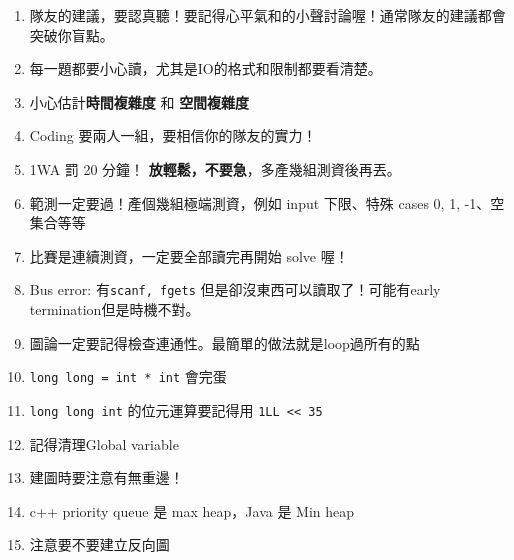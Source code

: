 \documentclass[10pt,oneside]{article}
\begin{document}
\begin{landscape}
\begin{multicols}{2}
{\large
\begin{enumerate}
\item 隊友的建議，要認真聽！要記得心平氣和的小聲討論喔！通常隊友的建議都會突破你盲點。
\item 每一題都要小心讀，尤其是IO的格式和限制都要看清楚。%
\item 小心估計\textbf{時間複雜度} 和 \textbf{空間複雜度}%
\item Coding 要兩人一組，要相信你的隊友的實力！
\item 1WA 罰 20 分鐘！ \textbf{放輕鬆，不要急}，多產幾組測資後再丟。%
\item 範測一定要過！產個幾組極端測資，例如 input 下限、特殊 cases 0, 1, -1、空集合等等 %
\item 比賽是連續測資，一定要全部讀完再開始 solve 喔！%
\item Bus error: 有\texttt{scanf, fgets} 但是卻沒東西可以讀取了！可能有early termination但是時機不對。 %
\item 圖論一定要記得檢查連通性。最簡單的做法就是loop過所有的點%
\item \texttt{long long = int * int} 會完蛋%
\item \texttt{long long int} 的位元運算要記得用 \texttt{1LL << 35} %
\item 記得清理Global variable
\item 建圖時要注意有無重邊！
\item c++ priority queue 是 max heap，Java 是 Min heap
\item 注意要不要建立反向圖 %
\end{enumerate}
}


\end{multicols}
\end{landscape}
\end{document}
